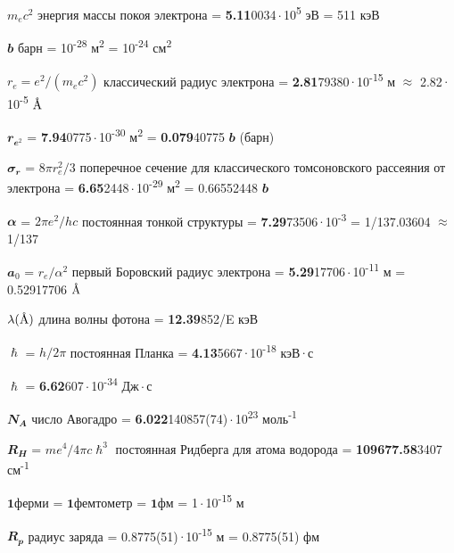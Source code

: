\documentclass[a4paper,14pt, openany, twoside, draft]{extbook} %
\newcommand{\AAA}{\textup{\AA}}
\begin{document}
$m_ec^2$  энергия массы покоя электрона = \textbf{5.11}0034\,$\cdot$\,10\textsuperscript{5} эВ = 511 кэВ

$\mathbfit{b}$  барн = 10\textsuperscript{-28} м\textsuperscript{2} = 10\textsuperscript{-24} см\textsuperscript{2}

$r_e=e^2/(m_ec^2)$  классический радиус электрона = \textbf{2.81}79380\,$\cdot$\,10\textsuperscript{-15} м $\approx$ 2.82\,$\cdot$\,10\textsuperscript{-5} $\AAA$

$\mathbfit{r_{e^2}}$ = \textbf{7.94}0775\,$\cdot$\,10\textsuperscript{-30} м\textsuperscript{2}  = \textbf{0.079}40775 $\mathbfit{b}$ (барн)

$\mathbfit{\sigma_r}$ = $8\pi r_e^2/3$ поперечное сечение для классического томсоновского рассеяния от электрона = \textbf{6.65}2448\,$\cdot$\,10\textsuperscript{-29} м\textsuperscript{2} = 0.66552448 $\mathbfit{b}$

$\mathbfit{\alpha}$ = $2\pi e^2/hc$ постоянная тонкой структуры = \textbf{7.29}73506\,$\cdot$\,10\textsuperscript{-3} = 1/137.03604 $\approx$ 1/137

$\mathbfit{a_0}$ = $r_e/\alpha^2$ первый Боровский радиус электрона  = \textbf{5.29}17706\,$\cdot$\,10\textsuperscript{-11} м = 0.52917706 $\AAA$

$\lambda(\AAA)$  длина волны фотона = \textbf{12.39}852/E кэВ

$\mathbfit{\hslash}$ = $h/2\pi$ постоянная Планка = \textbf{4.13}5667\,$\cdot$\,10\textsuperscript{-18} кэВ\,$\cdot$\,с

$\mathbfit{\hslash}$ = \textbf{6.62}607\,$\cdot$\,10\textsuperscript{-34} Дж\,$\cdot$\,с

$\mathbfit{N_A}$  число Авогадро = \textbf{6.022}140857(74)\,$\cdot$\,10\textsuperscript{23} моль\textsuperscript{-1}

$\mathbfit{R_H}$ = $me^4/4\pi c\hslash^3$ постоянная Ридберга для атома водорода = \textbf{109677.58}3407 см\textsuperscript{-1}

$\mathbf{1 ферми}$ = $\mathbf{1 фемтометр}$ = $\mathbf{1 фм}$ = 1\,$\cdot$\,10\textsuperscript{-15} м

$\mathbfit{R_p}$ радиус заряда = 0.8775(51)\,$\cdot$\,10\textsuperscript{-15} м = 0.8775(51) фм
\end{document}
